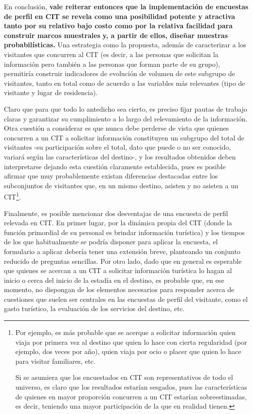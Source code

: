 \documentclass[
]{book}
\begin{document}
En conclusión, \textbf{vale reiterar entonces que la implementación de encuestas de perfil en CIT se revela como una posibilidad potente y atractiva tanto por su relativo bajo costo como por la relativa facilidad para construir marcos muestrales} \textbf{y, a partir de ellos, diseñar muestras probabilísticas.} Una estrategia como la propuesta, además de caracterizar a los visitantes que concurren al CIT (es decir, a las personas que solicitan la información pero también a las personas que forman parte de su grupo), permitiría construir indicadores de evolución de volumen de este subgrupo de visitantes, tanto en total como de acuerdo a las variables más relevantes (tipo de visitante y lugar de residencia).

Claro que para que todo lo antedicho sea cierto, es preciso fijar pautas de trabajo claras y garantizar su cumplimiento a lo largo del relevamiento de la información. Otra cuestión a considerar es que nunca debe perderse de vista que quienes concurren a un CIT a solicitar información constituyen un subgrupo del total de visitantes -su participación sobre el total, dato que puede o no ser conocido, variará según las características del destino-, y los resultados obtenidos deben interpretarse dejando esta cuestión claramente establecida, pues es posible afirmar que muy probablemente existan diferencias destacadas entre los subconjuntos de visitantes que, en un mismo destino, asisten y no asisten a un CIT\footnote{Por ejemplo, es más probable que se acerque a solicitar información quien viaja por primera vez al destino que quien lo hace con cierta regularidad (por ejemplo, dos veces por año), quien viaja por ocio o placer que quien lo hace para visitar familiares, etc.

  Si se asumiera que los encuestados en CIT son representativos de todo el universo, es claro que los resultados estarían sesgados, pues las características de quienes en mayor proporción concurren a un CIT estarían sobreestimadas, es decir, teniendo una mayor participación de la que en realidad tienen.}.

Finalmente, es posible mencionar dos desventajas de una encuesta de perfil relevada en CIT. En primer lugar, por la dinámica propia del CIT (donde la función primordial de su personal es brindar información turística) y los tiempos de los que habitualmente se podría disponer para aplicar la encuesta, el formulario a aplicar debería tener una extensión breve, planteando un conjunto reducido de preguntas sencillas. Por otro lado, dado que en general es esperable que quienes se acercan a un CIT a solicitar información turística lo hagan al inicio o cerca del inicio de la estadía en el destino, es probable que, en ese momento, no dispongan de los elementos necesarios para responder acerca de cuestiones que suelen ser centrales en las encuestas de perfil del visitante, como el gasto turístico, la evaluación de los servicios del destino, etc.
\end{document}

